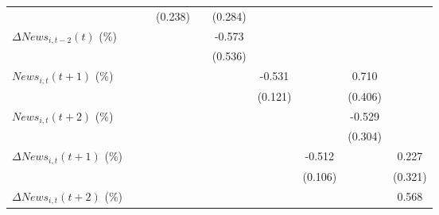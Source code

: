 {\begin{tabular}{l*{9}{c}}
                    &                     &                     &     (0.238)         &                     &     (0.284)         &                     &                     &                     &                     \\
\addlinespace
$ \Delta News_{i,t-2}(t)$ (\%)&                     &                     &                     &                     &      -0.573         &                     &                     &                     &                     \\
                    &                     &                     &                     &                     &     (0.536)         &                     &                     &                     &                     \\
\addlinespace
$ News_{i,t}(t+1)$ (\%)&                     &                     &                     &                     &                     &      -0.531\sym{***}&                     &       0.710\sym{*}  &                     \\
                    &                     &                     &                     &                     &                     &     (0.121)         &                     &     (0.406)         &                     \\
\addlinespace
$ News_{i,t}(t+2)$ (\%)&                     &                     &                     &                     &                     &                     &                     &      -0.529         &                     \\
                    &                     &                     &                     &                     &                     &                     &                     &     (0.304)         &                     \\
\addlinespace
$ \Delta News_{i,t}(t+1)$ (\%)&                     &                     &                     &                     &                     &                     &      -0.512\sym{***}&                     &       0.227         \\
                    &                     &                     &                     &                     &                     &                     &     (0.106)         &                     &     (0.321)         \\
\addlinespace
$ \Delta News_{i,t}(t+2)$ (\%)&                     &                     &                     &                     &                     &                     &                     &                     &       0.568         \\

\end{tabular}}
